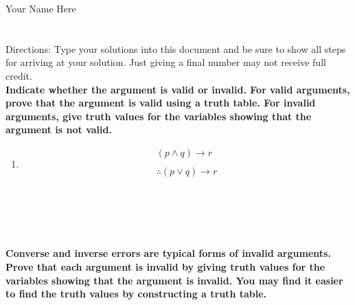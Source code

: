 \newcommand{\cG}{\mathcal G} \newcommand{\cH}{\mathcal H}
\newcommand{\cI}{\mathcal I} \newcommand{\cJ}{\mathcal J}
\newcommand{\cK}{\mathcal K} \newcommand{\cL}{\mathcal L}
\newcommand{\cM}{\mathcal M} \newcommand{\cN}{\mathcal N}
\newcommand{\cO}{\mathcal O} \newcommand{\cP}{\mathcal P}
\newcommand{\cQ}{\mathcal Q} \newcommand{\cR}{\mathcal R}
\newcommand{\cS}{\mathcal S} \newcommand{\cT}{\mathcal T}
\newcommand{\cU}{\mathcal U} \newcommand{\cV}{\mathcal V}
\newcommand{\cW}{\mathcal W} \newcommand{\cX}{\mathcal X}
\newcommand{\cY}{\mathcal Y} \newcommand{\cZ}{\mathcal Z}
Your Name Here
\section*{}
Directions: Type your solutions into this document and be sure to show all steps for arriving at your solution. Just giving a final number may not receive full credit.\\
{\bf Indicate whether the argument is valid or invalid. For valid arguments, prove that the argument is valid using a truth table. For invalid arguments, give truth values for the variables showing that the argument is not valid.}\\
 \begin{enumerate}
\item \[
\begin{array}{||c||}
\hline \hline
(p \land q) \to r\\
\\
\therefore (p \lor q) \to r\\
\end{array}
\]\\\\
 \\\\
   \end{enumerate}
{\bf Converse and inverse errors are typical forms of invalid arguments. Prove that each argument is invalid by giving truth values for the variables showing that the argument is invalid. You may find it easier to find the truth values by constructing a truth table.}\\
